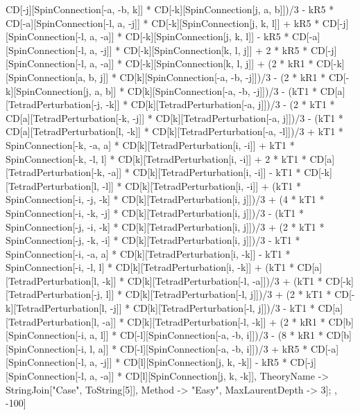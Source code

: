 CD[-j][SpinConnection[-a, -b, k]] * CD[-k][SpinConnection[j, a, b]])/3 - kR5 * CD[-a][SpinConnection[-l, a, -j]] * CD[-k][SpinConnection[j, k, l]] + kR5 * CD[-j][SpinConnection[-l, a, -a]] * CD[-k][SpinConnection[j, k, l]] - kR5 * CD[-a][SpinConnection[-l, a, -j]] * CD[-k][SpinConnection[k, l, j]] + 2 * kR5 * CD[-j][SpinConnection[-l, a, -a]] * CD[-k][SpinConnection[k, l, j]] + (2 * kR1 * CD[-k][SpinConnection[a, b, j]] * CD[k][SpinConnection[-a, -b, -j]])/3 - (2 * kR1 * CD[-k][SpinConnection[j, a, b]] * CD[k][SpinConnection[-a, -b, -j]])/3 - (kT1 * CD[a][TetradPerturbation[-j, -k]] * CD[k][TetradPerturbation[-a, j]])/3 - (2 * kT1 * CD[a][TetradPerturbation[-k, -j]] * CD[k][TetradPerturbation[-a, j]])/3 - (kT1 * CD[a][TetradPerturbation[l, -k]] * CD[k][TetradPerturbation[-a, -l]])/3 + kT1 * SpinConnection[-k, -a, a] * CD[k][TetradPerturbation[i, -i]] + kT1 * SpinConnection[-k, -l, l] * CD[k][TetradPerturbation[i, -i]] + 2 * kT1 * CD[a][TetradPerturbation[-k, -a]] * CD[k][TetradPerturbation[i, -i]] - kT1 * CD[-k][TetradPerturbation[l, -l]] * CD[k][TetradPerturbation[i, -i]] + (kT1 * SpinConnection[-i, -j, -k] * CD[k][TetradPerturbation[i, j]])/3 + (4 * kT1 * SpinConnection[-i, -k, -j] * CD[k][TetradPerturbation[i, j]])/3 - (kT1 * SpinConnection[-j, -i, -k] * CD[k][TetradPerturbation[i, j]])/3 + (2 * kT1 * SpinConnection[-j, -k, -i] * CD[k][TetradPerturbation[i, j]])/3 - kT1 * SpinConnection[-i, -a, a] * CD[k][TetradPerturbation[i, -k]] - kT1 * SpinConnection[-i, -l, l] * CD[k][TetradPerturbation[i, -k]] + (kT1 * CD[a][TetradPerturbation[l, -k]] * CD[k][TetradPerturbation[-l, -a]])/3 + (kT1 * CD[-k][TetradPerturbation[-j, l]] * CD[k][TetradPerturbation[-l, j]])/3 + (2 * kT1 * CD[-k][TetradPerturbation[l, -j]] * CD[k][TetradPerturbation[-l, j]])/3 - kT1 * CD[a][TetradPerturbation[l, -a]] * CD[k][TetradPerturbation[-l, -k]] + (2 * kR1 * CD[b][SpinConnection[-i, a, l]] * CD[-l][SpinConnection[-a, -b, i]])/3 - (8 * kR1 * CD[b][SpinConnection[-i, l, a]] * CD[-l][SpinConnection[-a, -b, i]])/3 + kR5 * CD[-a][SpinConnection[-l, a, -j]] * CD[l][SpinConnection[j, k, -k]] - kR5 * CD[-j][SpinConnection[-l, a, -a]] * CD[l][SpinConnection[j, k, -k]], TheoryName -> StringJoin["Case", ToString[5]], Method -> "Easy", MaxLaurentDepth -> 3]; , -100]